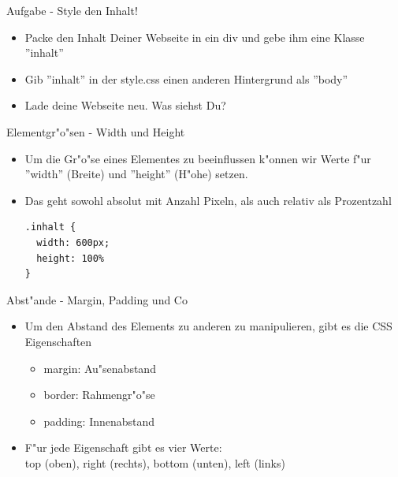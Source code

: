 \documentclass[18pt]{beamer}
\begin{document}
\begin{frame}[fragile]{Aufgabe - Style den Inhalt!}
\begin{itemize}
\item Packe den Inhalt Deiner Webseite in ein div und gebe ihm eine Klasse ''inhalt''
\item Gib ''inhalt'' in der style.css einen anderen Hintergrund als ''body''
\item Lade deine Webseite neu. Was siehst Du?
\end{itemize}
\end{frame}

\begin{frame}[fragile]{Elementgr"o"sen - Width und Height}
\begin{itemize}
\item Um die Gr"o"se eines Elementes zu beeinflussen k"onnen wir Werte f"ur ''width'' (Breite) und ''height'' (H"ohe) setzen.
\item Das geht sowohl absolut mit Anzahl Pixeln, als auch relativ als Prozentzahl
\begin{lstlisting}
.inhalt {
  width: 600px;
  height: 100%
}
\end{lstlisting}
\end{itemize}
\end{frame}

\begin{frame}[fragile]{Abst"ande - Margin, Padding und Co}
\begin{itemize}
\item Um den Abstand des Elements zu anderen zu manipulieren, gibt es die CSS Eigenschaften
\begin{itemize}
\item margin: Au"senabstand
\item border: Rahmengr"o"se
\item padding: Innenabstand
\end{itemize}
\item F"ur jede Eigenschaft gibt es vier Werte: \\
top (oben), right (rechts), bottom (unten), left (links)
\end{itemize}
\end{frame}
\end{document}
